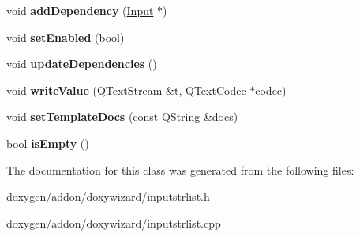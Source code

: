 \begin{DoxyCompactItemize}
void {\bfseries add\+Dependency} (\mbox{\hyperlink{class_input}{Input}} $\ast$)
\item 
\mbox{\label{class_input_str_list_a79ba8c5252c084ff39301b7f5f5a6871}} 
void {\bfseries set\+Enabled} (bool)
\item 
\mbox{\label{class_input_str_list_aeca36d956357014a77036cddf1f48cb8}} 
void {\bfseries update\+Dependencies} ()
\item 
\mbox{\label{class_input_str_list_a74b3b1b206990199513fa4d1c2c54143}} 
void {\bfseries write\+Value} (\mbox{\hyperlink{class_q_text_stream}{Q\+Text\+Stream}} \&t, \mbox{\hyperlink{class_q_text_codec}{Q\+Text\+Codec}} $\ast$codec)
\item 
\mbox{\label{class_input_str_list_ab8098b108a58dd377d60eb904fdbf3c7}} 
void {\bfseries set\+Template\+Docs} (const \mbox{\hyperlink{class_q_string}{Q\+String}} \&docs)
\item 
\mbox{\label{class_input_str_list_a7a413cdf80da74abd47ef45398030120}} 
bool {\bfseries is\+Empty} ()
\end{DoxyCompactItemize}


The documentation for this class was generated from the following files\+:\begin{DoxyCompactItemize}
\item 
doxygen/addon/doxywizard/inputstrlist.\+h\item 
doxygen/addon/doxywizard/inputstrlist.\+cpp\end{DoxyCompactItemize}
